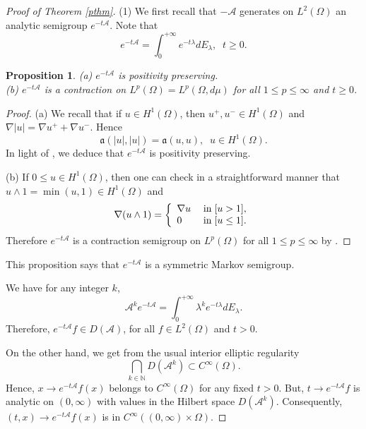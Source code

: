 \documentclass[10pt]{amsart}
\newtheorem{proposition}{Proposition}
\theoremstyle{definition}
\begin{document}
\begin{proof}[Proof of Theorem \ref{pthm}] (1) We first recall that $-\mathcal{A}$ generates on $L^2(\Omega )$ an analytic semigroup $e^{-t\mathcal{A}}$. Note that  
\[
e^{-t\mathcal{A}}=\int_0^{+\infty} e^{-t\lambda} dE_\lambda ,\;\; t\geq 0.
\] 

\begin{proposition}\label{proposition1}
(a) $e^{-t\mathcal{A}}$ is positivity preserving.
\\
(b) $e^{-t\mathcal{A}}$ is a contraction on $L^p(\Omega )=L^p(\Omega ,d\mu )$ for all $1\leq p\leq \infty$ and $t \geq 0$.
\end{proposition}

\begin{proof}
(a) We recall that if $u\in H^1(\Omega )$, then $u^+,u^-\in H^1(\Omega )$ and $\nabla |u|=\nabla u^++\nabla u^-$. Hence
\[
\mathfrak{a}(|u|,|u|)=\mathfrak{a}(u,u),\;\; u\in H^1(\Omega ).
\]
In light of \cite[Theorem 1.3.2, page 12]{Da}, we deduce that $e^{-t\mathcal{A}}$ is positivity preserving.

\medskip
(b) If $0\leq u\in H^1(\Omega )$, then one can check in a straightforward manner that $u\wedge 1=\min (u,1)\in H^1(\Omega )$ and
\[
\nabla (u\wedge 1)=\left\{ \begin{array}{ll} \nabla u\; &{\rm in}\;  [u>1],\\ 0 &{\rm in}\;  [u\leq 1]. \end{array}\right.
\]
Therefore $e^{-t\mathcal{A}}$ is a contraction semigroup on $L^p(\Omega )$ for all  $1\leq p\leq \infty$ 
 by \cite[Theorem 1.3.3, page 14]{Da}.
\end{proof}

This proposition says that $e^{-t\mathcal{A}}$ is a symmetric Markov semigroup.

\smallskip
We have for any integer $k$,
\begin{equation}\label{hk1}
\mathcal{A}^ke^{-t\mathcal{A}}= \int_0^{+\infty} \lambda ^ke^{-t\lambda} dE_\lambda .
\end{equation}
Therefore, $e^{-t\mathcal{A}}f\in D(\mathcal{A})$, for all  $f\in L^2(\Omega )$ and $t>0$.

\smallskip
On the other hand, we get from the usual interior elliptic regularity
\[
\bigcap_{k\in \mathbb{N}}D(\mathcal{A}^k)\subset C^\infty (\Omega ).
\]
Hence, $x\rightarrow e^{-t\mathcal{A}}f(x)$ belongs to $C^\infty (\Omega )$ for any fixed $t>0$. But, $t\rightarrow e^{-t\mathcal{A}}f$ is analytic on $(0,\infty )$ with values in the Hilbert space $D(\mathcal{A}^k)$. Consequently, $(t,x)\rightarrow e^{-t\mathcal{A}}f(x)$ is in $C^\infty ((0,\infty )\times \Omega )$.


\end{proof}
\end{document}
